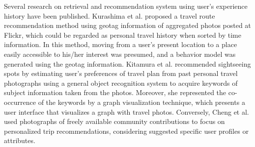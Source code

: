 \documentclass[journal]{IAENGtran}
\begin{document}
Several research on retrieval and recommendation system using user's experience history have been published.
Kurashima et al.\cite{Codd01} proposed a travel route recommendation method using geotag information of aggregated photos posted at Flickr, which could be regarded as personal travel history when sorted by time information.
In this method, moving from a user's present location to a place easily accessible to his/her interest was presumed, and a behavior model was generated using the geotag information.
Kitamura et al.\cite{Codd02} recommended sightseeing spots by estimating user's preferences of travel plan from past personal travel photographs using a general object recognition system to acquire keywords of subject information taken from the photos.
Moreover, she represented the co-occurrence of the keywords by a graph visualization technique, which presents a user interface that visualizes a graph with travel photos.
Conversely, Cheng et al.\cite{Codd03} used photographs of freely available community contributions to focus on personalized trip recommendations, considering suggested specific user profiles or attributes.

\end{document}
